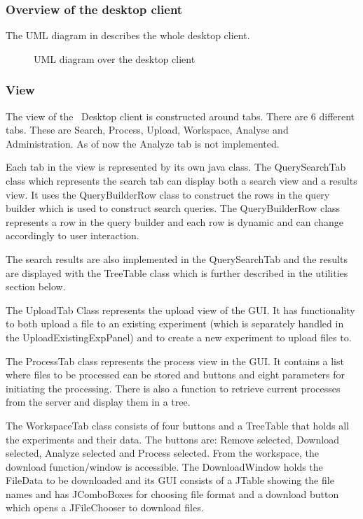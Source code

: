 
\subsubsection{Overview of the desktop client}
The UML diagram in  describes the whole desktop client.
\begin{figure}[htb!]
	\caption{UML diagram over the desktop client}
	\label{fig:des_uml-overview}
\end{figure}


\subsubsection{View}
The view of the \appName\ Desktop client is constructed around tabs. There are 6 different tabs. These are Search, Process, Upload, Workspace, Analyse and Administration. As of now the Analyze tab is not implemented.

Each tab in the view is represented by its own java class. The QuerySearchTab class which represents the search tab can display both a search view and a results view. It uses the QueryBuilderRow class to construct the rows in the query builder which is used to construct search queries. The QueryBuilderRow class represents a row in the query builder and each row is dynamic and can change accordingly to user interaction.

The search results are also implemented in the QuerySearchTab and the results are displayed with the TreeTable class which is further described in the utilities section below.

The UploadTab Class represents the upload view of the GUI. It has functionality to both upload a file to an existing experiment (which is separately handled in the UploadExistingExpPanel) and to create a new experiment to upload files to.

The ProcessTab class represents the process view in the GUI. It contains a list where files to be processed can be stored and buttons and eight parameters for initiating the processing. There is also a function to retrieve current processes from the server and display them in a tree.

The WorkspaceTab class consists of four buttons and a TreeTable that holds all the experiments and their data. The buttons are:  Remove selected, Download selected, Analyze selected and Process selected. From the workspace, the download function/window is accessible. The DownloadWindow holds the FileData to be downloaded and its GUI consists of a JTable showing the file names and has JComboBoxes for choosing file format and a download button which opens a JFileChooser to download files.

